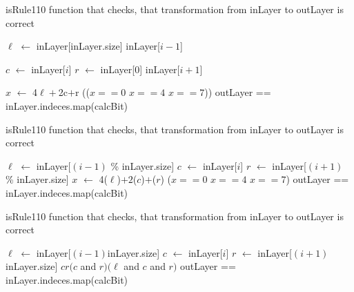 \documentclass[runningheads]{llncs}
\newcommand{\And}{\textsf{ and }}
\def\Let#1#2{\State #1 $\gets$ #2}
\begin{document}
    \begin{algorithm}[H]
        \caption{isRule110 function that checks, that transformation from
        inLayer to outLayer is correct}
        \label{alg:isRule110mod3}
        \begin{algorithmic}[1]

            \Let{$\ell$}{
                 {inLayer[inLayer.size]} {inLayer[$i-1$]}
            }
            \Let{$c$}{inLayer[$i$]}
            \Let{$r$}{
                 {inLayer[0]} {inLayer[$i+1$]}
            }
            \Let{$x$}{4$\ell+$2c$+$r}
            \State
            \Return \Int(\Not($x == 0$ \Or $x == 4$ \Or $x == 7$))
            \EndFunction
            \State 
            \Return outLayer == inLayer.indeces.map(calcBit)
            \EndFunction
            \vskip8pt
        \end{algorithmic}
    \end{algorithm}

    \begin{algorithm}[H]
        \caption{isRule110 function that checks, that transformation from
        inLayer to outLayer is correct}
        \label{alg:isRule110mod2}
        \begin{algorithmic}[1]
            \Let{$\ell$}{inLayer[$(i-1)$ \% inLayer.size]}
            \Let{$c$}{inLayer[$i$]}
            \Let{$r$}{inLayer[$(i+1)$ \% inLayer.size]}
            \Let{$x$}{4\Int($\ell$)$+2$\Int($c$)$+$\Int($r$)}
            \State
            \Return \Not($x == 0$ \Or $x == 4$ \Or $x == 7$)
            \EndFunction
            \State \Return outLayer == inLayer.indeces.map(calcBit)
            \EndFunction
            \vskip8pt
        \end{algorithmic}
    \end{algorithm}

    \begin{algorithm}[H]
        \caption{isRule110 function that checks, that transformation from
        inLayer to outLayer is correct}
        \label{alg:isRule110mod}
        \begin{algorithmic}[1]
            \Let{$\ell$}{inLayer[$(i-1)$\Mod inLayer.size]}
            \Let{$c$}{inLayer[$i$]}
            \Let{$r$}{inLayer[$(i+1)$\Mod inLayer.size]}
            \State
            \Return $c$\Xor$r$\Xor$(c$\And$r)$\Xor$(\ell$\And$c$\And$r)$
            \EndFunction
            \State \Return outLayer == inLayer.indeces.map(calcBit)
            \EndFunction
            \vskip8pt
        \end{algorithmic}
    \end{algorithm}
\end{document}
